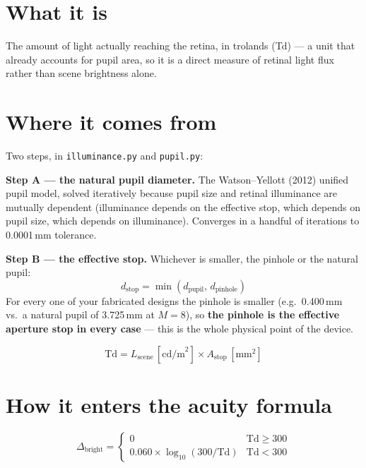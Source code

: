 \documentclass[11pt]{report}
\begin{document}
\section{What it is}

The amount of light actually reaching the retina, in trolands (Td) --- a unit that already accounts
for pupil area, so it is a direct measure of retinal light flux rather than scene brightness alone.

\section{Where it comes from}

Two steps, in \texttt{illuminance.py} and \texttt{pupil.py}:

\textbf{Step A --- the natural pupil diameter.} The Watson--Yellott (2012) unified pupil model,
solved iteratively because pupil size and retinal illuminance are mutually dependent (illuminance
depends on the effective stop, which depends on pupil size, which depends on illuminance). Converges
in a handful of iterations to 0.0001\,mm tolerance.

\textbf{Step B --- the effective stop.} Whichever is smaller, the pinhole or the natural pupil:
\begin{equation}
d_{\text{stop}} = \min(d_{\text{pupil}},\,d_{\text{pinhole}})
\end{equation}
For every one of your fabricated designs the pinhole is smaller (e.g.\ 0.400\,mm vs.\ a natural pupil
of 3.725\,mm at $M=8$), so \textbf{the pinhole is the effective aperture stop in every case} --- this
is the whole physical point of the device.

\begin{equation}
\text{Td} = L_{\text{scene}}\,[\text{cd/m}^2] \times A_{\text{stop}}\,[\text{mm}^2]
\end{equation}

\section{How it enters the acuity formula}

\begin{equation}
\Delta_{\text{bright}} = \begin{cases} 0 & \text{Td} \geq 300 \\[4pt]
0.060 \times \log_{10}(300/\text{Td}) & \text{Td} < 300 \end{cases}
\end{equation}
\end{document}
